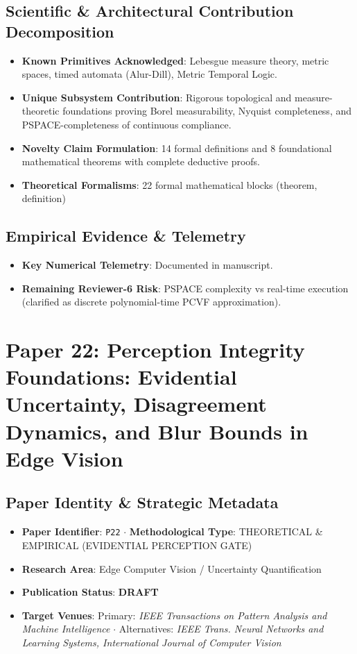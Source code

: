 \documentclass[11pt,a4paper]{article}
\begin{document}
\subsection*{Scientific & Architectural Contribution Decomposition}
\begin{itemize}[leftmargin=1.5em, itemsep=0.2em]
    \item \textbf{Known Primitives Acknowledged}: Lebesgue measure theory, metric spaces, timed automata (Alur-Dill), Metric Temporal Logic.
    \item \textbf{Unique Subsystem Contribution}: Rigorous topological and measure-theoretic foundations proving Borel measurability, Nyquist completeness, and PSPACE-completeness of continuous compliance.
    \item \textbf{Novelty Claim Formulation}: 14 formal definitions and 8 foundational mathematical theorems with complete deductive proofs.
    \item \textbf{Theoretical Formalisms}: 22 formal mathematical blocks (theorem, definition)
\end{itemize}

\subsection*{Empirical Evidence & Telemetry}
\begin{itemize}[leftmargin=1.5em, itemsep=0.2em]
    \item \textbf{Key Numerical Telemetry}: Documented in manuscript.
    \item \textbf{Remaining Reviewer-6 Risk}: PSPACE complexity vs real-time execution (clarified as discrete polynomial-time PCVF approximation).
\end{itemize}

\section{Paper 22: Perception Integrity Foundations: Evidential Uncertainty, Disagreement Dynamics, and Blur Bounds in Edge Vision}

\subsection*{Paper Identity \& Strategic Metadata}
\begin{itemize}[leftmargin=1.5em, itemsep=0.2em]
    \item \textbf{Paper Identifier}: \texttt{P22} $\cdot$ \textbf{Methodological Type}: THEORETICAL \& EMPIRICAL (EVIDENTIAL PERCEPTION GATE)
    \item \textbf{Research Area}: Edge Computer Vision / Uncertainty Quantification
    \item \textbf{Publication Status}: \textbf{DRAFT}
    \item \textbf{Target Venues}: Primary: \textit{IEEE Transactions on Pattern Analysis and Machine Intelligence} $\cdot$ Alternatives: \textit{IEEE Trans. Neural Networks and Learning Systems, International Journal of Computer Vision}
\end{itemize}
\end{document}
